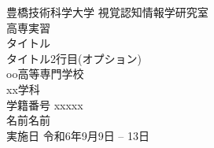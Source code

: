 \begin{titlepage}
	\begin{center}
		\vspace*{30truept}
		{\Large
		豊橋技術科学大学 視覚認知情報学研究室\\
		高専実習} \\
		\vspace{100truept}
		{\LARGE タイトル}\\
		\vspace{12truept}
		{\LARGE タイトル2行目(オプション)} \\
		\vspace{80truept}
		{\large
		oo高等専門学校\\
		xx学科\\
		}
		\vspace{50truept}
		{\large 学籍番号 xxxxx}\\ %

		\vspace{10truept}
		{\large  名前名前}\\ %

		\vspace{50truept}
		{\large 実施日 令和6年9月9日 -- 13日}\\ %
	\end{center}
\end{titlepage}


